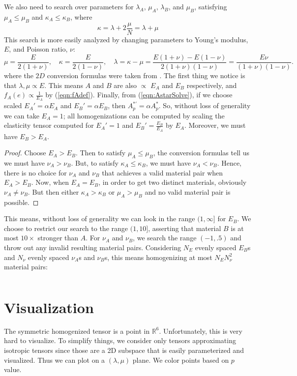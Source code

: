 \documentclass[10pt]{article}
\begin{document}
We also need to search over parameters for $\lambda_A$, $\mu_A$, $\lambda_B$,
and $\mu_B$, satisfying $\mu_A \le \mu_B$ and $\kappa_A \le \kappa_B$, where
$$
 \kappa = \lambda + 2\frac{\mu}{N} = \lambda + \mu
$$
This search is more easily analyzed by changing parameters to Young's modulus,
$E$, and Poisson ratio, $\nu$:
$$
\mu = \frac{E}{2(1 + \nu)}, \quad
\kappa = \frac{E}{2(1 - \nu)}, \quad
\lambda = \kappa - \mu = \frac{E(1 + \nu) - E(1 - \nu)}{2(1 + \nu)(1 - \nu)}
= \frac{E \nu}{(1 + \nu)(1 - \nu)}.
$$
where the $2D$ conversion formulas were taken from \cite{jasiuk}.
The first thing we notice is that $\lambda, \mu \propto E$. This means $A$ and
$B$ are also $\propto$ $E_A$ and $E_B$ respectively, and $f_A(e) \propto
\frac{1}{E_A}$ by (\ref{eqn:fAdef}).
Finally, from (\ref{eqn:AstarSolve}), if we choose scaled $E_A' = \alpha E_A$
and $E_B' = \alpha E_B$, then $A_p^{*\prime} = \alpha A_p^*$. So, without loss of
generality we can take $E_A = 1$; all homogenizations can be computed
by scaling the elasticity tensor computed for $E_A' = 1$ and $E_B' =
\frac{E_B}{E_A}$ by $E_A$. Moreover, we must have $E_B > E_A$.
\begin{proof}
    Choose $E_A > E_B$. Then to satisfy $\mu_A \le \mu_B$, the conversion
    formulas tell us we must have $\nu_A > \nu_B$. But, to satisfy $\kappa_A \le
    \kappa_B$, we must have $\nu_A < \nu_B$. Hence, there is no choice for
    $\nu_A$ and $\nu_B$ that achieves a valid material pair when $E_A > E_B$.
    Now, when $E_A = E_B$, in order to get two distinct materials, obviously
    $\nu_A \ne \nu_B$. But then either $\kappa_A > \kappa_B$ or $\mu_A > \mu_B$
    and no valid material pair is possible.
\end{proof}
This means, without loss of generality we can look in the range $(1, \infty]$
for $E_B$. We choose to restrict our search to the range $(1, 10]$, asserting
that material $B$ is at most $10\times$ stronger than $A$. For $\nu_A$ and
$\nu_B$, we search the range $(-1, .5)$ and throw out any invalid resulting
material pairs. Considering $N_E$ evenly spaced $E_B$s and $N_\nu$ evenly spaced
$\nu_A$s and $\nu_B$s, this means homogenizing at most $N_E N_\nu^2$ material
pairs:
\inputminted[linenos,fontsize=\footnotesize]{matlab}{materialScan.m}


\section{Visualization}
The symmetric homogenized tensor is a point in $\mathbb{R}^6$. Unfortunately,
this is very hard to visualize. To simplify things, we consider only tensors
approximating isotropic tensors since those are a 2D subspace that is easily
parameterized and visualized. Thus we can plot on a $(\lambda, \mu)$ plane. We
color points based on $p$ value.



\end{document}
